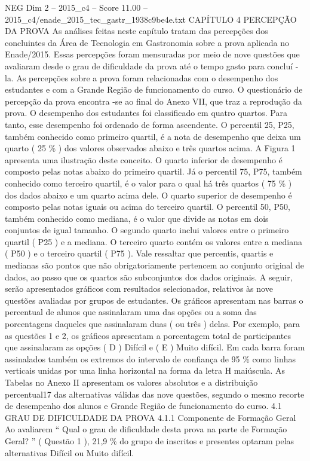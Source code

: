 \begin{textsample}{NEG Dim 2 – 2015\_c4 – Score 11.00 – 2015\_c4/enade\_2015\_tec\_gastr\_1938c9be4e.txt}  \label{ex:f2_neg_353}
CAPÍTULO 4 PERCEPÇÃO DA PROVA As análises feitas neste capítulo tratam das percepções dos concluintes da Área de Tecnologia em Gastronomia sobre a prova aplicada no Enade/2015.
Essas percepções foram mensuradas por meio de nove questões que avaliaram desde o grau de dificuldade da prova até o tempo gasto para concluí -la.
As percepções sobre a prova foram relacionadas com o desempenho dos estudantes e com a Grande Região de funcionamento do curso.
O questionário de percepção da prova encontra -se ao final do Anexo VII, que traz a reprodução da prova.
O desempenho dos estudantes foi classificado em quatro quartos.
Para tanto, esse desempenho foi ordenado de forma ascendente.
O percentil 25, P25, também conhecido como primeiro quartil, é a nota de desempenho que deixa um quarto ( 25 \% ) dos valores observados abaixo e três quartos acima.
A Figura 1 apresenta uma ilustração deste conceito.
O quarto inferior de desempenho é composto pelas notas abaixo do primeiro quartil.
Já o percentil 75, P75, também conhecido como terceiro quartil, é o valor para o qual há três quartos ( 75 \% ) dos dados abaixo e um quarto acima dele.
O quarto superior de desempenho é composto pelas notas iguais ou acima do terceiro quartil.
O percentil 50, P50, também conhecido como mediana, é o valor que divide as notas em dois conjuntos de igual tamanho.
O segundo quarto inclui valores entre o primeiro quartil ( P25 ) e a mediana.
O terceiro quarto contém os valores entre a mediana ( P50 ) e o terceiro quartil ( P75 ).
Vale ressaltar que percentis, quartis e medianas são pontos que não obrigatoriamente pertencem ao conjunto original de dados, ao passo que os quartos são subconjuntos dos dados originais.
A seguir, serão apresentados gráficos com resultados selecionados, relativos às nove questões avaliadas por grupos de estudantes.
Os gráficos apresentam nas barras o percentual de alunos que assinalaram uma das opções ou a soma das porcentagens daqueles que assinalaram duas ( ou três ) delas.
Por exemplo, para as questões 1 e 2, os gráficos apresentam a porcentagem total de participantes que assinalaram as opções ( D ) Difícil e ( E ) Muito difícil.
Em cada barra foram assinalados também os extremos do intervalo de confiança de 95 \% como linhas verticais unidas por uma linha horizontal na forma da letra H maiúscula.
As Tabelas no Anexo II apresentam os valores absolutos e a distribuição percentual17 das alternativas válidas das nove questões, segundo o mesmo recorte de desempenho dos alunos e Grande Região de funcionamento do curso. 4.1 GRAU DE DIFICULDADE DA PROVA 4.1.1 Componente de Formação Geral Ao avaliarem “ Qual o grau de dificuldade desta prova na parte de Formação Geral? ” ( Questão 1 ), 21,9 \% do grupo de inscritos e presentes optaram pelas alternativas Difícil ou Muito difícil.

\end{textsample}
